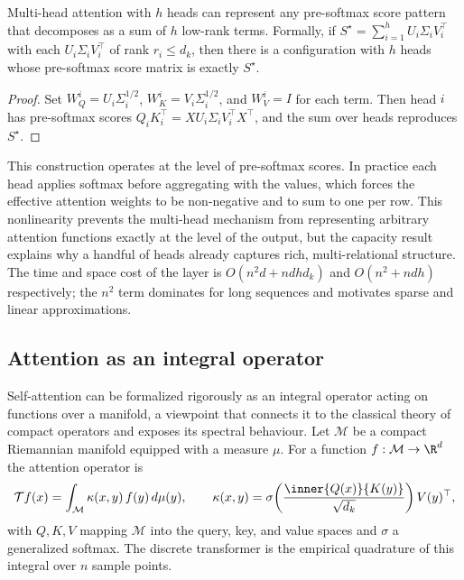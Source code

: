 \begin{proposition}
\label{prop:apps:multihead-capacity}
Multi-head attention with $h$ heads can represent any pre-softmax score pattern
that decomposes as a sum of $h$ low-rank terms. Formally, if
$S^\star = \sum_{i=1}^h U_i\Sigma_i V_i^\top$ with each
$U_i\Sigma_i V_i^\top$ of rank $r_i\le d_k$, then there is a configuration with
$h$ heads whose pre-softmax score matrix is exactly $S^\star$.
\end{proposition}

\begin{proof}
Set $W_Q^i = U_i\Sigma_i^{1/2}$, $W_K^i = V_i\Sigma_i^{1/2}$, and $W_V^i = I$
for each term. Then head $i$ has pre-softmax scores
$Q_i K_i^\top = X U_i\Sigma_i V_i^\top X^\top$, and the sum over heads reproduces
$S^\star$.
\end{proof}

\begin{remark}
\label{rem:apps:multihead-nonlinearity}
This construction operates at the level of pre-softmax scores. In practice each
head applies softmax before aggregating with the values, which forces the
effective attention weights to be non-negative and to sum to one per row. This
nonlinearity prevents the multi-head mechanism from representing arbitrary
attention functions exactly at the level of the output, but the capacity result
explains why a handful of heads already captures rich, multi-relational
structure. The time and space cost of the layer is
$O(n^2 d + n d h d_k)$ and $O(n^2 + ndh)$ respectively; the $n^2$ term dominates
for long sequences and motivates sparse and linear approximations.
\end{remark}

\subsection{Attention as an integral operator}
\label{subsec:apps:integral-operator}

Self-attention can be formalized rigorously as an integral operator acting on
functions over a manifold, a viewpoint that connects it to the classical theory
of compact operators and exposes its spectral behaviour. Let $\mathcal{M}$ be a
compact Riemannian manifold equipped with a measure $\mu$. For a function
$f:\mathcal{M}\to\R^d$ the attention operator is
\[
  \mathcal{T}f(x) = \int_{\mathcal{M}} \kappa(x,y)\, f(y)\, d\mu(y),
  \qquad
  \kappa(x,y) = \sigma\!\left(\frac{\inner{Q(x)}{K(y)}}{\sqrt{d_k}}\right) V(y)^\top,
\]
with $Q,K,V$ mapping $\mathcal{M}$ into the query, key, and value spaces and
$\sigma$ a generalized softmax. The discrete transformer is the empirical
quadrature of this integral over $n$ sample points.

